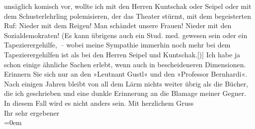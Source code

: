 \begin{ledgroupsized}[t]{13cm}
               unsäglich komisch vor, wollte ich mit den Herren Kuntschak oder Seipel oder mit dem
               Schusterlehrling polemisieren, der das Theater stürmt, mit dem begeisterten Ruf:
               Nieder mit dem Reigen! Man schändet unsere Frauen! Nieder mit den Sozialdemokraten!
               (Es kann übrigens auch ein Stud. med. gewesen sein oder ein Tapezierergehilfe, –
               wobei meine Sympathie immerhin noch mehr bei dem Tapezierergehilfen ist als bei den
               Herren Seipel und Kuntschak.{[}){]} Ich habe ja schon einige
               ähnliche Sachen erlebt, wenn auch in bescheideneren Dimensionen. Erinnern Sie sich
               nur an den »Leutnant Gustl« und den »Professor Bernhardi«. Nach einigen Jahren bleibt
               von all dem Lärm nichts weiter übrig als die Bücher, die ich geschrieben und eine
               dunkle Erinnerung an die Blamage meiner Gegner. In diesem Fall wird es nicht anders
               sein.\pend
           \pstart
           Mit herzlichem Gruss{\\[\baselineskip]}Ihr sehr ergebener{\\[\baselineskip]}\pend
           \leftskip=0em{}
         
         \endnumbering{}\end{ledgroupsized}  \newcommand{\dateiname}{L02363}\newcommand{\titel}{Arthur Schnitzler an Stefan Großmann, 17. 2. 1921}\newcommand{\editorInnen}{Martin Anton Müller und Gerd-Hermann Susen}
      